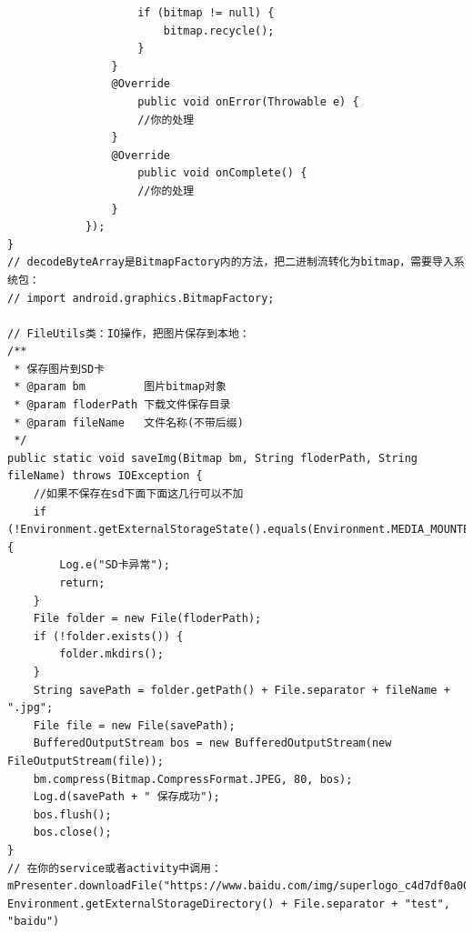 \documentclass[9pt, b5paper]{article}
\begin{document}
\begin{verbatim}
                    if (bitmap != null) {
                        bitmap.recycle();
                    }
                }
                @Override
                    public void onError(Throwable e) {
                    //你的处理
                }
                @Override
                    public void onComplete() {
                    //你的处理
                }
            });
}
// decodeByteArray是BitmapFactory内的方法，把二进制流转化为bitmap，需要导入系统包：
// import android.graphics.BitmapFactory;

// FileUtils类：IO操作，把图片保存到本地：
/**
 * 保存图片到SD卡
 * @param bm         图片bitmap对象
 * @param floderPath 下载文件保存目录
 * @param fileName   文件名称(不带后缀)
 */
public static void saveImg(Bitmap bm, String floderPath, String fileName) throws IOException {
    //如果不保存在sd下面下面这几行可以不加
    if (!Environment.getExternalStorageState().equals(Environment.MEDIA_MOUNTED)) {
        Log.e("SD卡异常");
        return;
    }
    File folder = new File(floderPath);
    if (!folder.exists()) {
        folder.mkdirs();
    }
    String savePath = folder.getPath() + File.separator + fileName + ".jpg";
    File file = new File(savePath);
    BufferedOutputStream bos = new BufferedOutputStream(new FileOutputStream(file));
    bm.compress(Bitmap.CompressFormat.JPEG, 80, bos);
    Log.d(savePath + " 保存成功");
    bos.flush();
    bos.close();
}
// 在你的service或者activity中调用：
mPresenter.downloadFile("https://www.baidu.com/img/superlogo_c4d7df0a003d3db9b65e9ef0fe6da1ec.png", Environment.getExternalStorageDirectory() + File.separator + "test", "baidu")
\end{verbatim}
\end{document}
